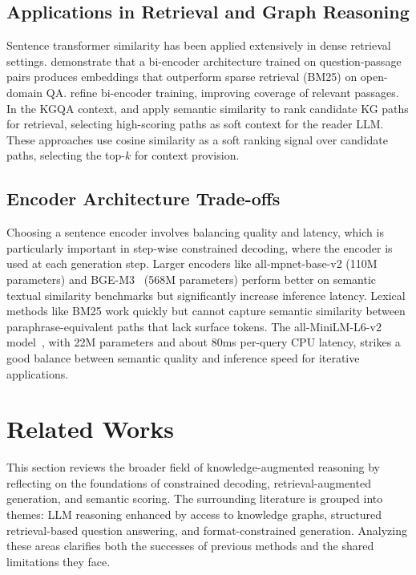 \subsection{Applications in Retrieval and Graph Reasoning}

Sentence transformer similarity has been applied extensively in dense retrieval settings. \citet{karpukhin2020dpr} demonstrate that a bi-encoder architecture trained on question-passage pairs produces embeddings that outperform sparse retrieval (BM25) on open-domain QA. \citet{xiong2020adore} refine bi-encoder training, improving coverage of relevant passages. In the KGQA context, \citet{shi2021kgpath} and \citet{saxena2022kgqa} apply semantic similarity to rank candidate KG paths for retrieval, selecting high-scoring paths as soft context for the reader LLM. These approaches use cosine similarity as a soft ranking signal over candidate paths, selecting the top-$k$ for context provision.

\subsection{Encoder Architecture Trade-offs}

Choosing a sentence encoder involves balancing quality and latency, which is particularly important in step-wise constrained decoding, where the encoder is used at each generation step. Larger encoders like all-mpnet-base-v2 (110M parameters) and BGE-M3~\citep{chen2024bge} (568M parameters) perform better on semantic textual similarity benchmarks but significantly increase inference latency. Lexical methods like BM25 work quickly but cannot capture semantic similarity between paraphrase-equivalent paths that lack surface tokens. The all-MiniLM-L6-v2 model~\citep{reimers2019sbert}, with 22M parameters and about 80ms per-query CPU latency, strikes a good balance between semantic quality and inference speed for iterative applications.

\section{Related Works}
\label{sec:related}
This section reviews the broader field of knowledge-augmented reasoning by reflecting on the foundations of constrained decoding, retrieval-augmented generation, and semantic scoring. The surrounding literature is grouped into themes: LLM reasoning enhanced by access to knowledge graphs, structured retrieval-based question answering, and format-constrained generation. Analyzing these areas clarifies both the successes of previous methods and the shared limitations they face.

